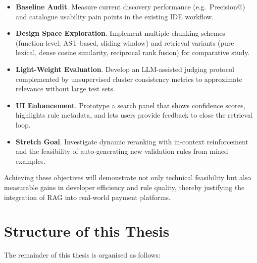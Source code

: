 \begin{itemize}
    \item \textbf{Baseline Audit}. Measure current discovery performance (e.g.\ Precision@) and catalogue usability pain points in the existing IDE workflow.
    \item \textbf{Design Space Exploration}. Implement multiple chunking schemes (function-level, AST-based, sliding window) and retrieval variants (pure lexical, dense cosine similarity, reciprocal rank fusion) for comparative study.
    \item \textbf{Light-Weight Evaluation}. Develop an LLM-assisted judging protocol complemented by unsupervised cluster consistency metrics to approximate relevance without large test sets.
    \item \textbf{UI Enhancement}. Prototype a search panel that shows confidence scores, highlights rule metadata, and lets users provide feedback to close the retrieval loop.
    \item \textbf{Stretch Goal}. Investigate dynamic reranking with in-context reinforcement and the feasibility of auto-generating new validation rules from mined examples.
\end{itemize}

Achieving these objectives will demonstrate not only technical feasibility but also measurable gains in developer efficiency and rule quality, thereby justifying the integration of RAG into real-world payment platforms.

\section{Structure of this Thesis}
\label{sec:structure}

The remainder of this thesis is organised as follows:

